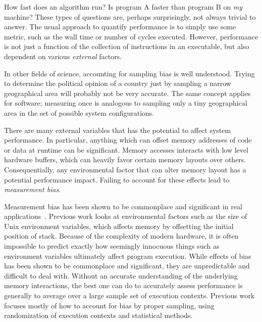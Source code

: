 \documentclass[a4paper,10pt,twocolumn,twoside]{article}
\begin{document}
How fast does an algorithm run?
Is program A faster than program B on \emph{my} machine?
These types of questions are, perhaps surprisingly, not always trivial to answer.
The usual approach to quantify performance is to simply use some metric, such as the wall time or number of cycles executed.
However, performance is not just a function of the collection of instructions in an executable, but also dependent on various \emph{external} factors.

In other fields of science, accounting for sampling bias is well understood.
Trying to determine the political opinion of a country just by sampling a narrow geographical area will probably not be very accurate.
The same concept applies for software; measuring once is analogous to sampling only a tiny geographical area in the set of possible system configurations.

There are many external variables that has the potential to affect system performance.
In particular, anything which can offset memory addresses of code or data at runtime can be significant.
Memory accesses interacts with low level hardware buffers, which can heavily favor certain memory layouts over others.
Consequentially, any environmental factor that can alter memory layout has a potential performance impact.
Failing to account for these effects lead to \emph{measurement bias}. 

Measurement bias has been shown to be commonplace and significant in real applications~\cite{Mytkowicz:2008:OE&MB, Mytkowicz:2009:WrongData, Mytkowicz:2008:Easy}.
Previous work looks at environmental factors such as the size of Unix environment variables, which affects memory by offsetting the initial position of stack.
Because of the complexity of modern hardware, it is often impossible to predict exactly how seemingly innocuous things such as environment variables ultimately affect program execution.
While effects of bias has been shown to be commonplace and significant, they are unpredictable and difficult to deal with.
Without an accurate understanding of the underlying memory interactions, the best one can do to accurately assess performance is generally to average over a large sample set of execution contexts.
Previous work focuses mostly of how to account for bias by proper sampling, using randomization of execution contexts and statistical methods. %
\end{document}
